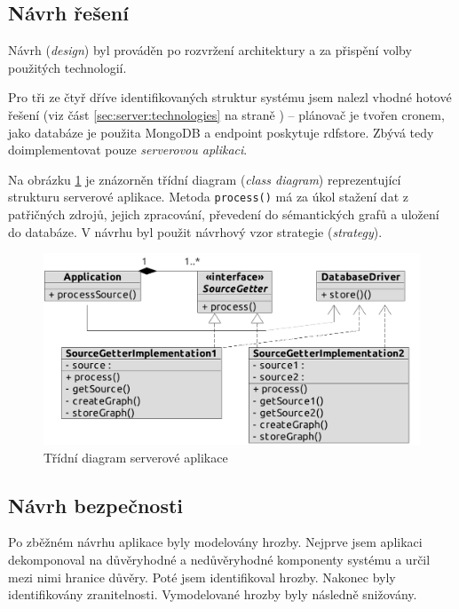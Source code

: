 \subsection{Návrh řešení}
Návrh (\textit{design}) byl prováděn po rozvržení architektury a za přispění volby použitých technologií.

Pro tři ze čtyř dříve identifikovaných struktur systému jsem nalezl vhodné hotové řešení (viz část \ref{sec:server:technologies} na straně \pageref{sec:server:technologies}) -- plánovač je tvořen cronem, jako databáze je použita MongoDB a  endpoint poskytuje rdfstore. Zbývá tedy doimplementovat pouze \textit{serverovou aplikaci}.

Na obrázku \ref{fig:server:class} je znázorněn třídní diagram (\textit{class diagram}) reprezentující strukturu serverové aplikace. Metoda \texttt{process()} má za úkol stažení dat z patřičných zdrojů, jejich zpracování, převedení do sémantických grafů a uložení do databáze. V návrhu byl použit návrhový vzor strategie (\textit{strategy}).

\begin{figure}[h]
 \centering
 \includegraphics[width=11.47cm]{./figures/class-s.pdf}
 \caption{Třídní diagram serverové aplikace}
 \label{fig:server:class}
\end{figure}



\subsection{Návrh bezpečnosti}
Po zběžném návrhu aplikace byly modelovány hrozby. Nejprve jsem aplikaci dekomponoval na důvěryhodné a nedůvěryhodné komponenty systému a určil mezi nimi hranice důvěry. Poté jsem identifikoval hrozby. Nakonec byly identifikovány zranitelnosti. Vymodelované hrozby byly následně snižovány.

